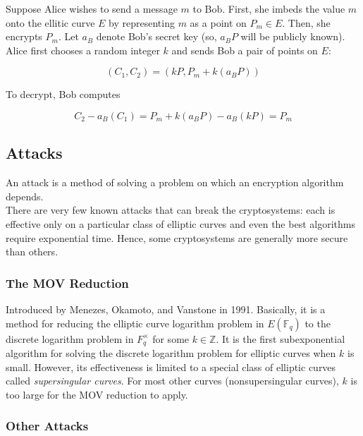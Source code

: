 \documentclass[12pt]{article}
\newcommand{\F}{\mathbb{F}}
\newcommand{\Z}{\mathbb{Z}}
\begin{document}
Suppose Alice wishes to send a message $m$ to Bob. First, she imbeds the value $m$ onto the ellitic curve $E$ by representing $m$ as a point on $P_m \in E$. Then, she encrypts $P_m$. Let $a_B$ denote Bob's secret key (so, $a_BP$ will be publicly known). Alice first chooses a random integer $k$ and sends Bob a pair of points on $E$: 

\begin{displaymath}
(C_1, C_2) = (kP, P_m + k(a_BP))
\end{displaymath}  

To decrypt, Bob computes 

\begin{displaymath}
C_2 - a_B(C_1) = P_m + k(a_BP) - a_B(kP) = P_m
\end{displaymath}

\subsection{Attacks}

 An attack is a method of solving a problem on which an encryption algorithm depends. \\

There are very few known attacks that can break the cryptosystems: each is effective only on a particular class of elliptic curves and even the best algorithms require exponential time. Hence, some cryptosystems are generally more secure than others. 

\subsubsection{The MOV Reduction}

Introduced by Menezes, Okamoto, and Vanstone in 1991. Basically, it is a method for reducing the elliptic curve logarithm problem in $E(\F_q)$ to the discrete logarithm problem in $F_q^{\times}$ for some $k \in \Z$. It is the first subexponential algorithm for solving the discrete logarithm problem for elliptic curves when $k$ is small. However, its effectiveness is limited to a special class of elliptic curves called \emph{supersingular curves}. For most other curves (nonsupersingular curves), $k$ is too large for the MOV reduction to apply. 

\subsubsection{Other Attacks}
\end{document}
